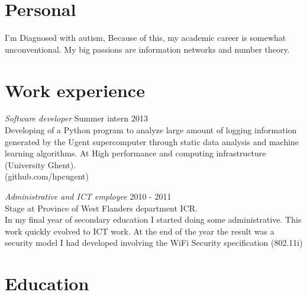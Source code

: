 \documentclass[margin, 10pt]{res} %
\begin{document}
\begin{resume}

 
\section{Personal}
I'm Diagnosed with autism, Because of this, my academic career is somewhat \\unconventional. My big passions are information networks and number theory.
\section{Work experience}
{\sl Software developer} \hfill Summer intern 2013 \\
Developing of a Python program to analyze large amount of logging information generated by the Ugent supercomputer through static data analysis and machine learning algorithms.
At High performance and computing infrastructure (University Ghent).\\ (github.com/hpcugent)

{\sl Administrative and ICT employee} \hfill 2010 - 2011 \\
Stage at Province of West Flanders department ICR. \\
In my final year of secondary education I started doing some administrative. This work quickly evolved to ICT work. At the end of the year the result was a security model I had developed involving the WiFi Security specification (802.11i)

\section{Education}


\end{resume}
\end{document}
